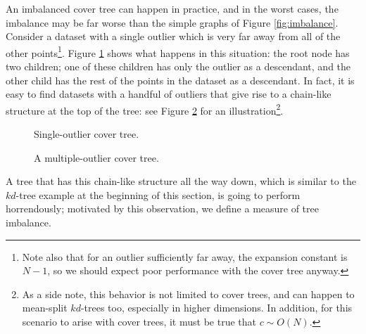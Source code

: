 An imbalanced cover tree can happen in practice, and in the worst cases, the
imbalance may be far worse than the simple graphs of Figure \ref{fig:imbalance}.
Consider a dataset with a single outlier which is very far away from all of the
other points\footnote{Note also that for an outlier sufficiently far away, the
expansion constant is $N - 1$, so we should expect poor performance with the
cover tree anyway.}.  Figure \ref{fig:outlier} shows what happens in
this situation: the root node has two children; one of these children has only
the outlier as a descendant, and the other child has the rest of the points in
the dataset as a descendant.  In fact, it is easy to find datasets with a
handful of outliers that give rise to a chain-like structure at the top of the
tree: see Figure \ref{fig:outliers} for an illustration\footnote{As a side note,
this behavior is not limited to cover trees, and can happen to mean-split
$kd$-trees too, especially in higher dimensions.  In addition, for this
scenario to arise with cover trees, it must be true that $c \sim O(N)$.}.

\begin{figure}
\begin{center}
  
\end{center}
\caption{Single-outlier cover tree.}
\label{fig:outlier}
\end{figure}

\begin{figure}
\begin{center}
  
\end{center}
\caption{A multiple-outlier cover tree.}
\label{fig:outliers}
\end{figure}

A tree that has this chain-like structure all the way down, which is similar to
the $kd$-tree example at the beginning of this section, is going to perform
horrendously; motivated by this observation, we define a measure of tree
imbalance.

